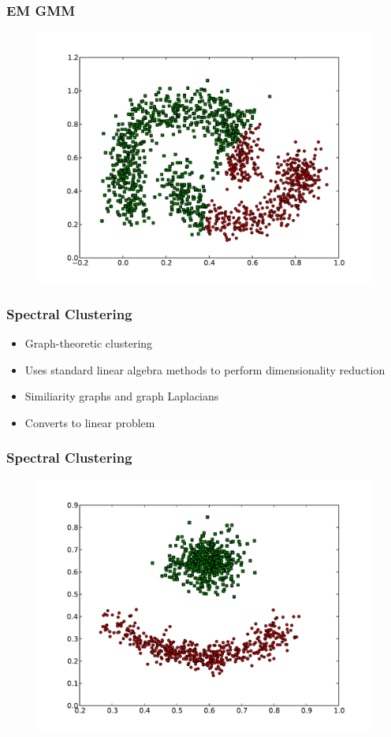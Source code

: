 \documentclass{beamer}
\begin{document}
\begin{frame}
\frametitle{EM GMM}
    \begin{figure}[]
    \includegraphics[scale=0.5]{GMM_half-moons.pdf}
    \end{figure}
\end{frame}



\begin{frame}
\frametitle{Spectral Clustering}
    \begin{itemize}
	\item Graph-theoretic clustering
    	\item Uses standard linear algebra methods to perform dimensionality reduction
   	\item Similiarity graphs and graph Laplacians
   	\item Converts to linear problem
    \end{itemize}
\end{frame}

\begin{frame}
\frametitle{Spectral Clustering}
    \begin{figure}[]
    \includegraphics[scale=0.5]{spectral_red-blue-cluster.pdf}
    \end{figure}
\end{frame}
\end{document}
